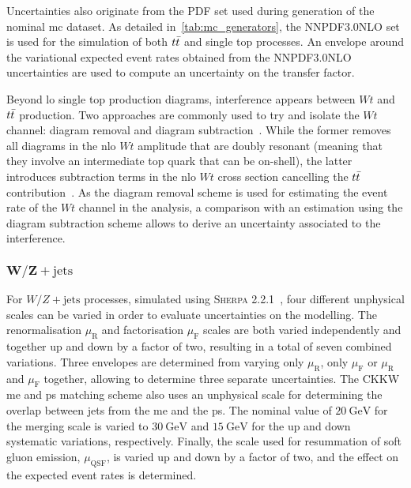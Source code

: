  Uncertainties also originate from the \gls{PDF} set used during generation of the nominal \gls{mc} dataset.
 As detailed in~\cref{tab:mc_generators}, the \textsc{NNPDF3.0NLO} set is used for the simulation of both $t\bar{t}$ and single top processes.
 An envelope around the variational expected event rates obtained from the \textsc{NNPDF3.0NLO} uncertainties are used to compute an uncertainty on the transfer factor.
 
 Beyond \gls{lo} single top production diagrams, interference appears between $Wt$ and $t\bar{t}$ production.
 Two approaches are commonly used to try and isolate the $Wt$ channel: diagram removal and diagram subtraction~\cite{Frixione:2008yi}.
 While the former removes all diagrams in the \gls{nlo} $Wt$ amplitude that are doubly resonant (meaning that they involve an intermediate top quark that can be on-shell), the latter introduces subtraction terms in the \gls{nlo} $Wt$ cross section cancelling the $t\bar{t}$ contribution~\cite{Frixione:2008yi}.
 As the diagram removal scheme is used for estimating the event rate of the $Wt$ channel in the analysis, a comparison with an estimation using the diagram subtraction scheme allows to derive an uncertainty associated to the interference.
  
 \subsubsection{$\boldsymbol{W/Z+\mathrm{jets}}$}
 
 For $W/Z+\mathrm{jets}$ processes, simulated using \textsc{Sherpa 2.2.1}~\cite{Gleisberg:2008ta,Bothmann:2019yzt}, four different unphysical scales can be varied in order to evaluate uncertainties on the modelling.
 The renormalisation $\mu_\mathrm{R}$ and factorisation $\mu_\mathrm{F}$ scales are both varied independently and together up and down by a factor of two, resulting in a total of seven combined variations.
 Three envelopes are determined from varying only $\mu_\mathrm{R}$, only $\mu_\mathrm{F}$ or $\mu_\mathrm{R}$ and $\mu_\mathrm{F}$ together, allowing to determine three separate uncertainties.
 The CKKW \gls{me} and \gls{ps} matching scheme also uses an unphysical scale for determining the overlap between jets from the \gls{me} and the \gls{ps}.
 The nominal value of $\SI{20}{\GeV}$ for the merging scale is varied to $\SI{30}{\GeV}$ and $\SI{15}{\GeV}$ for the up and down systematic variations, respectively.
 Finally, the scale used for resummation of soft gluon emission, $\mu_\mathrm{QSF}$, is varied up and down by a factor of two, and the effect on the expected event rates is determined.
 
